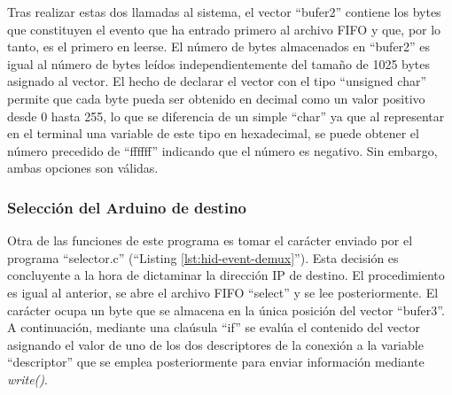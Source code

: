 
Tras realizar estas dos llamadas al sistema, el vector ``bufer2'' contiene los bytes que constituyen el evento que ha entrado primero al archivo FIFO y que, por lo tanto, es el primero en leerse. El número de bytes almacenados en ``bufer2'' es igual al número de bytes leídos independientemente del tamaño  de 1025 bytes asignado al vector. El hecho de declarar el vector con el tipo ``unsigned char'' permite que cada byte pueda ser obtenido en decimal como un valor positivo desde 0 hasta 255, lo que se diferencia de un simple ``char'' ya que al representar en el terminal una variable de este tipo en hexadecimal, se puede obtener el número precedido de ``ffffff'' indicando que el número es negativo. Sin embargo, ambas opciones son válidas.

\subsubsection{Selección del Arduino de destino}\label{s3_5_1_2}

Otra de las funciones de este programa es tomar el carácter enviado por el programa ``selector.c'' (``Listing \ref{lst:hid-event-demux}''). Esta decisión es concluyente a la hora de dictaminar la dirección IP de destino. El procedimiento es igual al anterior, se abre el archivo FIFO ``select'' y se lee posteriormente. El carácter ocupa un byte que se almacena en la única posición del vector ``bufer3''. A continuación, mediante una claúsula ``if'' se evalúa el contenido del vector asignando el valor de uno de los dos descriptores de la conexión a la variable ``descriptor'' que se emplea posteriormente para enviar información mediante {\itshape write()}.


